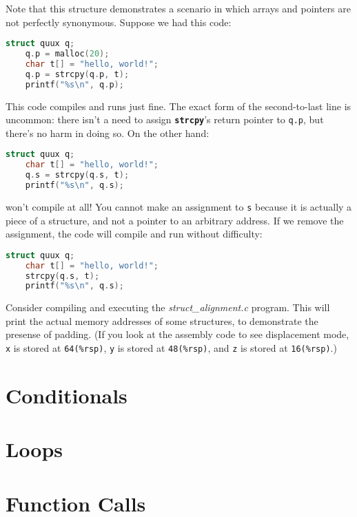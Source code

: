 \documentclass{article}
\newcommand{\function}[1]{\textbf{\lstinline{#1}}}
\begin{document}
Note that this structure demonstrates a scenario in which arrays and pointers are not perfectly synonymous.
Suppose we had this code:

\begin{lstlisting}[language=C]
    struct quux q;
    q.p = malloc(20);
    char t[] = "hello, world!";
    q.p = strcpy(q.p, t);
    printf("%s\n", q.p);
\end{lstlisting}

This code compiles and runs just fine.
The exact form of the second-to-last line is uncommon: there isn't a need to assign \function{strcpy}'s return pointer to \lstinline{q.p}, but there's no harm in doing so.
On the other hand:

\begin{lstlisting}[language=C]
    struct quux q;
    char t[] = "hello, world!";
    q.s = strcpy(q.s, t);
    printf("%s\n", q.s);
\end{lstlisting}

won't compile at all!
You cannot make an assignment to \lstinline{s} because it is actually a piece of a structure, and not a pointer to an arbitrary address.
If we remove the assignment, the code will compile and run without difficulty:

\begin{lstlisting}[language=C]
    struct quux q;
    char t[] = "hello, world!";
    strcpy(q.s, t);
    printf("%s\n", q.s);
\end{lstlisting}

Consider compiling and executing the \textit{struct\_alignment.c} program.
This will print the actual memory addresses of some structures, to demonstrate the presense of padding.
(If you look at the assembly code to see displacement mode, \lstinline{x} is stored at \lstinline{64(%rsp)}, \lstinline{y} is stored at \lstinline{48(%rsp)}, and \lstinline{z} is stored at \lstinline{16(%rsp)}.)

\section{Conditionals}

\section{Loops}

\section{Function Calls}
\end{document}
